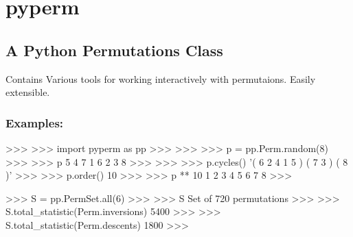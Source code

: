 \documentclass[]{article}
\newenvironment{Shaded}{}{}
\newcommand{\DataTypeTok}[1]{\textcolor[rgb]{0.56,0.13,0.00}{{#1}}}
\newcommand{\DecValTok}[1]{\textcolor[rgb]{0.25,0.63,0.44}{{#1}}}
\newcommand{\CharTok}[1]{\textcolor[rgb]{0.25,0.44,0.63}{{#1}}}
\newcommand{\StringTok}[1]{\textcolor[rgb]{0.25,0.44,0.63}{{#1}}}
\newcommand{\NormalTok}[1]{{#1}}
\begin{document}
\section{pyperm}

\subsection{A Python Permutations Class}

Contains Various tools for working interactively with permutaions.
Easily extensible.

\subsubsection{Examples:}

\begin{Shaded}
\begin{Highlighting}[]
\NormalTok{>>>}
\NormalTok{>>> }\CharTok{import} \NormalTok{pyperm }\CharTok{as} \NormalTok{pp}
\NormalTok{>>> }
\NormalTok{>>> }
\NormalTok{>>> p = pp.Perm.random(}\DecValTok{8}\NormalTok{)}
\NormalTok{>>> }
\NormalTok{>>> p}
 \DecValTok{5} \DecValTok{4} \DecValTok{7} \DecValTok{1} \DecValTok{6} \DecValTok{2} \DecValTok{3} \DecValTok{8} 
\NormalTok{>>> }
\NormalTok{>>> }
\NormalTok{>>> p.cycles()}
\StringTok{'( 6 2 4 1 5 ) ( 7 3 ) ( 8 )'}
\NormalTok{>>> }
\NormalTok{>>> p.order()}
\DecValTok{10}
\NormalTok{>>> }
\NormalTok{>>> p ** }\DecValTok{10}
 \DecValTok{1} \DecValTok{2} \DecValTok{3} \DecValTok{4} \DecValTok{5} \DecValTok{6} \DecValTok{7} \DecValTok{8}
\NormalTok{>>>}

\NormalTok{>>> S = pp.PermSet.}\DataTypeTok{all}\NormalTok{(}\DecValTok{6}\NormalTok{)}
\NormalTok{>>> }
\NormalTok{>>> S}
 \NormalTok{Set of }\DecValTok{720} \NormalTok{permutations}
\NormalTok{>>> }
\NormalTok{>>> S.total_statistic(Perm.inversions)}
 \DecValTok{5400}
\NormalTok{>>> }
\NormalTok{>>> S.total_statistic(Perm.descents)}
 \DecValTok{1800}
\NormalTok{>>> }


\end{Highlighting}
\end{Shaded}
\end{document}
